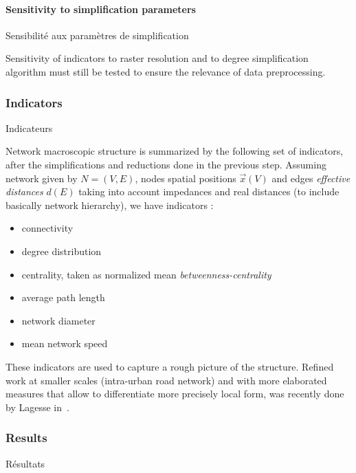 \paragraph{Sensitivity to simplification parameters}{Sensibilité aux paramètres de simplification}

Sensitivity of indicators to raster resolution and to degree simplification algorithm must still be tested to ensure the relevance of data preprocessing.


\subsubsection{Indicators}{Indicateurs}

Network macroscopic structure is summarized by the following set of indicators, after the simplifications and reductions done in the previous step. Assuming network given by $N=(V,E)$, nodes spatial positions $\vec{x}(V)$ and edges \emph{effective distances} $d(E)$ taking into account impedances and real distances (to include basically network hierarchy), we have indicators :


\begin{itemize}
\item connectivity
\item degree distribution
\item centrality, taken as normalized mean \emph{betweenness-centrality}
\item average path length
\item network diameter
\item mean network speed
\end{itemize}

These indicators are used to capture a rough picture of the structure. Refined work at smaller scales (intra-urban road network) and with more elaborated measures that allow to differentiate more precisely local form, was recently done by Lagesse in~\cite{2015arXiv151201268L}.



\subsubsection{Results}{Résultats}









